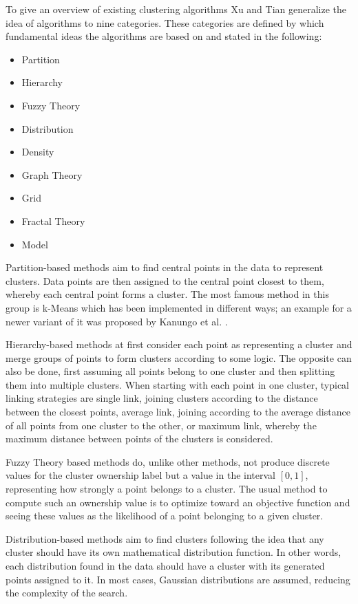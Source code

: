 \documentclass[
	a4paper,
	english,
	twoside,
	openright,               
	11pt                            
	]{report}
\begin{document}
To give an overview of existing clustering algorithms Xu and Tian \cite{surveyclustering} generalize the idea of algorithms to nine categories. These categories are defined by which fundamental ideas the algorithms are based on and stated in the following:
\begin{itemize}
  \item Partition
  \item Hierarchy
  \item Fuzzy Theory
  \item Distribution
  \item Density
  \item Graph Theory
  \item Grid
  \item Fractal Theory
  \item Model
\end{itemize}

Partition-based methods aim to find central points in the data to represent clusters. Data points are then assigned to the central point closest to them, whereby each central point forms a cluster. The most famous method in this group is k-Means which has been implemented in different ways; an example for a newer variant of it was proposed by Kanungo et al. \cite{1017616}.

Hierarchy-based methods at first consider each point as representing a cluster and merge groups of points to form clusters according to some logic. The opposite can also be done, first assuming all points belong to one cluster and then splitting them into multiple clusters. When starting with each point in one cluster, typical linking strategies are single link, joining clusters according to the distance between the closest points, average link, joining according to the average distance of all points from one cluster to the other, or maximum link, whereby the maximum distance between points of the clusters is considered.

Fuzzy Theory based methods do, unlike other methods, not produce discrete values for the cluster ownership label but a value in the interval $[0,1]$, representing how strongly a point belongs to a cluster. The usual method to compute such an ownership value is to optimize toward an objective function and seeing these values as the likelihood of a point belonging to a given cluster.

Distribution-based methods aim to find clusters following the idea that any cluster should have its own mathematical distribution function. In other words, each distribution found in the data should have a cluster with its generated points assigned to it. In most cases, Gaussian distributions are assumed, reducing the complexity of the search.
\end{document}
